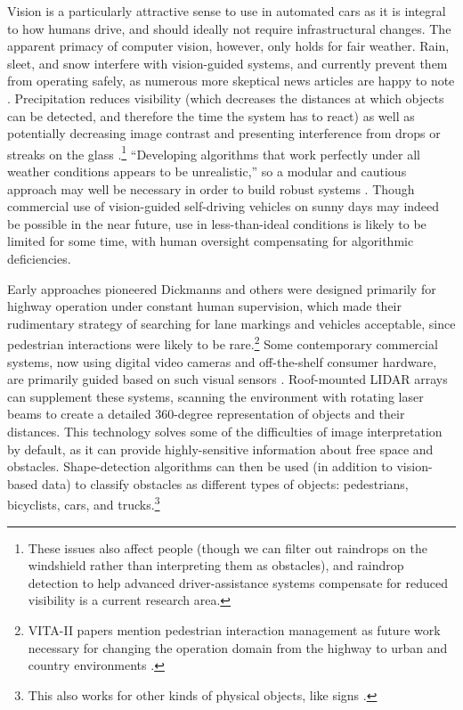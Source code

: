 Vision is a particularly attractive sense to use in automated cars
as it is integral to how humans drive, and should ideally not
require infrastructural changes. The apparent primacy of computer
vision, however, only holds for fair 
weather. Rain, sleet, and 
snow interfere with vision-guided systems, and currently prevent them
from operating safely, as numerous more skeptical news articles are
happy to note \cite{knightFurther} \cite{gomesObstacles}.
Precipitation reduces visibility (which decreases
the distances at which objects can be detected, and therefore the
time the system has to react) as well as potentially decreasing image
contrast and presenting interference from drops or
streaks on the glass
\cite{rainADAS}.\footnote{These issues also 
affect people (though we can filter out raindrops on the
windshield rather than interpreting them as obstacles), and raindrop
detection to help advanced driver-assistance systems compensate for
reduced visibility is a current research area.} 
``Developing algorithms that work perfectly
under all weather conditions appears to be unrealistic,'' so a
modular and cautious approach may well be necessary in order to build
robust systems \cite[p. 50]{rainADAS}. Though commercial use of
vision-guided self-driving vehicles on 
sunny days may indeed be possible in the near future, use in
less-than-ideal conditions is likely to be limited for some time,
with human oversight compensating for algorithmic deficiencies. 



Early approaches pioneered
Dickmanns and others were designed primarily for 
highway operation under constant human supervision, which made their
rudimentary strategy of searching for lane markings and vehicles
acceptable, since pedestrian interactions were likely to be
rare.\footnote{VITA-II papers mention pedestrian
  interaction management as future work necessary for changing the
  operation domain from the highway to urban and country environments \cite{ulmerVITA-II}.}
Some contemporary commercial systems, now using digital video cameras
and off-the-shelf consumer hardware, are primarily guided based on
such visual sensors \cite{makingBertha}. Roof-mounted
LIDAR arrays can supplement
these systems, scanning the environment with 
rotating laser beams to create a detailed 360-degree
representation of objects and their distances. This technology
solves some of the difficulties of image interpretation by default, as
it can provide highly-sensitive information about free space and
obstacles. Shape-detection algorithms can then be used (in addition to
vision-based data) to classify obstacles as different types of
objects: pedestrians, bicyclists, cars, and trucks.\footnote{This also
  works for other kinds of physical objects, like signs \cite{fukuda}.}

